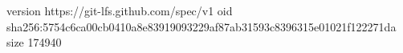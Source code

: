 version https://git-lfs.github.com/spec/v1
oid sha256:5754c6ca00cb0410a8e83919093229af87ab31593c8396315e01021f122271da
size 174940
